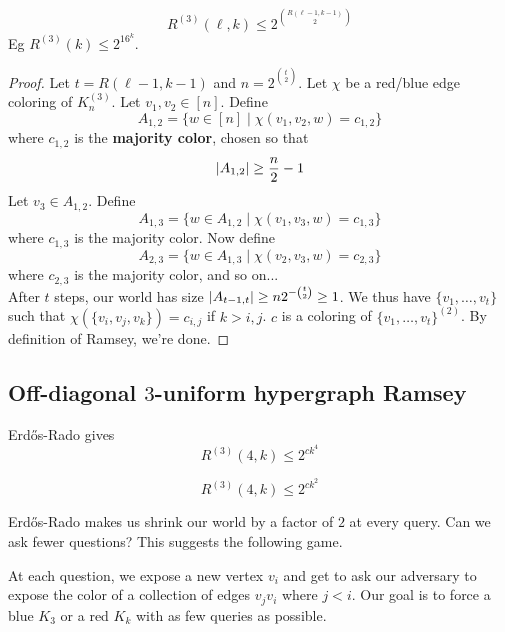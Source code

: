 \documentclass{article}
\begin{document}
\begin{thm}
  $$R^{(3)}(\ell, k) \le 2^{\binom{R(\ell - 1, k - 1)}2}$$
  Eg $R^{(3)}(k) \le 2^{16^k}$.
\end{thm}
\begin{proof}
  Let $t = R(\ell - 1, k - 1)$ and $n = 2^{\binom t2}$. Let $\chi$ be a red/blue edge coloring of $K_n^{(3)}$. Let $v_1, v_2 \in [n]$. Define
  $$A_{1, 2} = \{w \in [n] \mid \chi({v_1, v_2, w}) = c_{1, 2}\}$$
  where $c_{1, 2}$ is the {\bf majority color}, chosen so that
  $$\left\lvert A_{1, 2}\right\rvert \ge \frac n2 - 1$$
  Let $v_3 \in A_{1, 2}$. Define
  $$A_{1, 3} = \{w \in A_{1, 2} \mid \chi({v_1, v_3, w}) = c_{1, 3}\}$$
  where $c_{1, 3}$ is the majority color. Now define
  $$A_{2, 3} = \{w \in A_{1, 3} \mid \chi({v_2, v_3, w}) = c_{2, 3}\}$$
  where $c_{2, 3}$ is the majority color, and so on... \\
  After $t$ steps, our world has size $\left\lvert A_{t - 1, t}\right\rvert \ge n2^{-\binom t2} \ge 1$. We thus have $\{v_1, \dots, v_t\}$ such that $\chi(\{v_i, v_j, v_k\}) = c_{i, j}$ if $k > i, j$. $c$ is a coloring of $\{v_1, \dots, v_t\}^{(2)}$. By definition of Ramsey, we're done.
\end{proof}

\clearpage

\subsection{Off-diagonal \texorpdfstring{$3$}{3}-uniform hypergraph Ramsey}

\newlec

Erd\H os-Rado gives
$$R^{(3)}(4, k) \le 2^{ck^4}$$

\begin{thm}
  $$R^{(3)}(4, k) \le 2^{ck^2}$$
\end{thm}

Erd\H os-Rado makes us shrink our world by a factor of $2$ at every query. Can we ask fewer questions? This suggests the following game.

\begin{defi}
  At each question, we expose a new vertex $v_i$ and get to ask our adversary to expose the color of a collection of edges $v_j v_i$ where $j < i$. Our goal is to force a blue $K_3$ or a red $K_k$ with as few queries as possible.
\end{defi}
\end{document}
